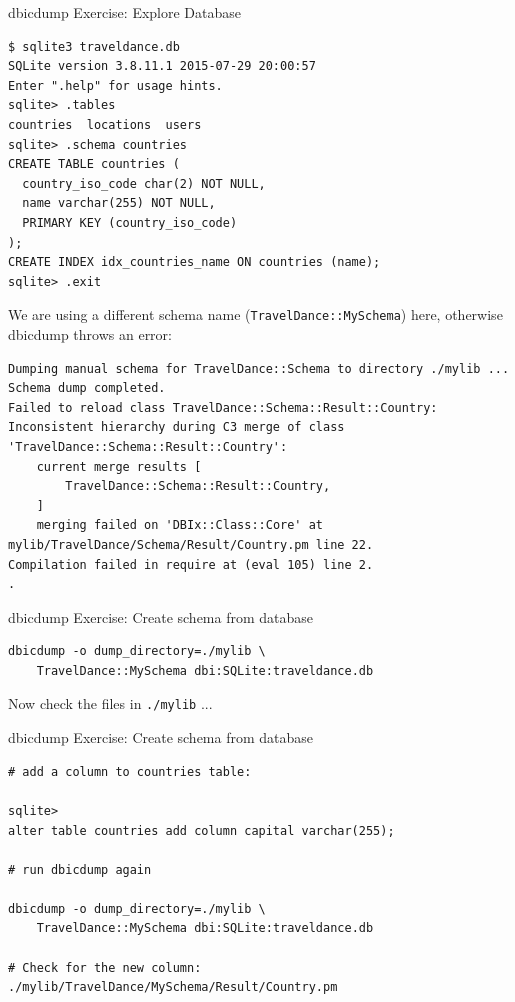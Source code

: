 \begin{frame}[fragile]{dbicdump Exercise: Explore Database}
\begin{lstlisting}
$ sqlite3 traveldance.db
SQLite version 3.8.11.1 2015-07-29 20:00:57
Enter ".help" for usage hints.
sqlite> .tables
countries  locations  users
sqlite> .schema countries
CREATE TABLE countries (
  country_iso_code char(2) NOT NULL,
  name varchar(255) NOT NULL,
  PRIMARY KEY (country_iso_code)
);
CREATE INDEX idx_countries_name ON countries (name);
sqlite> .exit
\end{lstlisting}
\end{frame}

We are using a different schema name (\verb|TravelDance::MySchema|) here,
otherwise dbicdump throws an error:

\begin{lstlisting}
Dumping manual schema for TravelDance::Schema to directory ./mylib ...
Schema dump completed.
Failed to reload class TravelDance::Schema::Result::Country: Inconsistent hierarchy during C3 merge of class 'TravelDance::Schema::Result::Country':
	current merge results [
		TravelDance::Schema::Result::Country,
	]
	merging failed on 'DBIx::Class::Core' at mylib/TravelDance/Schema/Result/Country.pm line 22.
Compilation failed in require at (eval 105) line 2.
.
\end{lstlisting}

\begin{frame}[fragile]{dbicdump Exercise: Create schema from database}
\begin{lstlisting}
dbicdump -o dump_directory=./mylib \
    TravelDance::MySchema dbi:SQLite:traveldance.db
\end{lstlisting}

Now check the files in \verb|./mylib| ...
\end{frame}

\begin{frame}[fragile]{dbicdump Exercise: Create schema from database}
\begin{lstlisting}
# add a column to countries table:

sqlite> 
alter table countries add column capital varchar(255);

# run dbicdump again

dbicdump -o dump_directory=./mylib \
    TravelDance::MySchema dbi:SQLite:traveldance.db

# Check for the new column:
./mylib/TravelDance/MySchema/Result/Country.pm

\end{lstlisting}
\end{frame}

